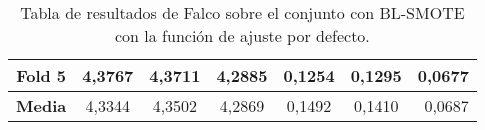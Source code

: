 \begin{table}[H]
{\begin{tabular}{|crrrrrr|}
\multicolumn{1}{|c|}{\textbf{Fold 5}} & \multicolumn{1}{c|}{4,3767}            & \multicolumn{1}{c|}{4,3711}              & \multicolumn{1}{c|}{4,2885}          & \multicolumn{1}{c|}{0,1254}            & \multicolumn{1}{c|}{0,1295}              & 0,0677                             \\ \hline
\multicolumn{1}{|c|}{\textbf{Media}}  & \multicolumn{1}{c|}{4,3344}           & \multicolumn{1}{c|}{4,3502}             & \multicolumn{1}{c|}{4,2869}         & \multicolumn{1}{c|}{0,1492}           & \multicolumn{1}{c|}{0,1410}             & 0,0687                            \\ \hline
\end{tabular}%
}
\caption{Tabla de resultados de Falco sobre el conjunto con BL-SMOTE con la función de ajuste por defecto.}\label{tablaFALCOconBLSMOTEdefecto}

\end{table}

